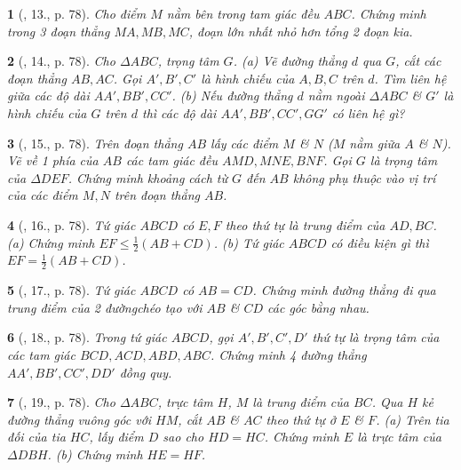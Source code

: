 \documentclass{article}
\newtheorem{baitoan}{}
\begin{document}
\begin{baitoan}[\cite{Binh_Toan_8_tap_1}, 13., p. 78]
	Cho điểm $M$ nằm bên trong tam giác đều $ABC$. Chứng minh trong 3 đoạn thẳng $MA,MB,MC$, đoạn lớn nhất nhỏ hơn tổng 2 đoạn kia.
\end{baitoan}

\begin{baitoan}[\cite{Binh_Toan_8_tap_1}, 14., p. 78]
	Cho $\Delta ABC$, trọng tâm $G$. (a) Vẽ đường thẳng $d$ qua $G$, cắt các đoạn thẳng $AB,AC$. Gọi $A',B',C'$ là hình chiếu của $A,B,C$ trên $d$. Tìm liên hệ giữa các độ dài $AA',BB',CC'$. (b) Nếu đường thẳng $d$ nằm ngoài $\Delta ABC$ \& $G'$ là hình chiếu của $G$ trên $d$ thì các độ dài $AA',BB',CC',GG'$ có liên hệ gì?
\end{baitoan}

\begin{baitoan}[\cite{Binh_Toan_8_tap_1}, 15., p. 78]
	Trên đoạn thẳng $AB$ lấy các điểm $M$ \& $N$ ($M$ nằm giữa $A$ \& $N$). Vẽ về 1 phía của $AB$ các tam giác đều $AMD,MNE,BNF$. Gọi $G$ là trọng tâm của $\Delta DEF$. Chứng minh khoảng cách từ $G$ đến $AB$ không phụ thuộc vào vị trí của các điểm $M,N$ trên đoạn thẳng $AB$.
\end{baitoan}

\begin{baitoan}[\cite{Binh_Toan_8_tap_1}, 16., p. 78]
	Tứ giác $ABCD$ có $E,F$ theo thứ tự là trung điểm của $AD,BC$. (a) Chứng minh $EF\le\frac{1}{2}(AB + CD)$. (b) Tứ giác $ABCD$ có điều kiện gì thì $EF = \frac{1}{2}(AB + CD)$.
\end{baitoan}

\begin{baitoan}[\cite{Binh_Toan_8_tap_1}, 17., p. 78]
	Tứ giác $ABCD$ có $AB = CD$. Chứng minh đường thẳng đi qua trung điểm của 2 đườngchéo tạo với $AB$ \& $CD$ các góc bằng nhau.
\end{baitoan}

\begin{baitoan}[\cite{Binh_Toan_8_tap_1}, 18., p. 78]
	Trong tứ giác $ABCD$, gọi $A',B',C',D'$ thứ tự là trọng tâm của các tam giác $BCD,ACD,ABD,ABC$. Chứng minh 4 đường thẳng $AA',BB',CC',DD'$ đồng quy.
\end{baitoan}

\begin{baitoan}[\cite{Binh_Toan_8_tap_1}, 19., p. 78]
	Cho $\Delta ABC$, trực tâm $H$, $M$ là trung điểm của $BC$. Qua $H$ kẻ đường thẳng vuông góc với $HM$, cắt $AB$ \& $AC$ theo thứ tự ở $E$ \& $F$. (a) Trên tia đối của tia $HC$, lấy điểm $D$ sao cho $HD = HC$. Chứng minh $E$ là trực tâm của $\Delta DBH$. (b) Chứng minh $HE = HF$.
\end{baitoan}
\end{document}
